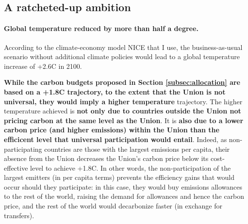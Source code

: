 \documentclass[12pt,english]{article}
\begin{document}
\subsection{A ratcheted-up ambition\label{subsec:ambition}}

\paragraph{Global temperature reduced by more than half a degree.}
According to the climate-economy model NICE that I use, the business-as-usual scenario without additional climate policies would lead to a global temperature increase of +2.6\textdegree{}C in 2100. %

\textbf{While the carbon budgets proposed in Section \ref{subsec:allocation} are based on a +1.8\textdegree{}C trajectory, to the extent that the Union is not universal, they would imply a higher temperature} trajectory. The higher temperature achieved is \textbf{not only due to countries outside the Union not pricing carbon at the same level as the Union}. %
It is \textbf{also due to a lower carbon price (and higher emissions) within the Union than the efficicent level that universal participation would entail}. Indeed, as non-participating countries are those with the largest emissions per capita, their absence from the Union decreases the Union's carbon price below its cost-effective level to achieve +1.8\textdegree{}C. In other words, the non-participation of the largest emitters (in per capita terms) prevents the efficiency gains that would occur should they participate: in this case, they would buy emissions allowances to the rest of the world, raising the demand for allowances and hence the carbon price, and the rest of the world would decarbonize faster (in exchange for transfers). 
\end{document}
